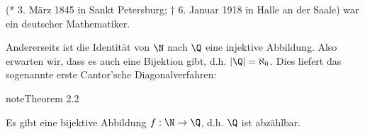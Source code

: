 \documentclass[letterpaper,10pt,english]{jupyterBook}
\begin{document}
\begin{sphinxShadowBox}

 (* 3. März 1845 in Sankt Petersburg; † 6. Januar 1918 in Halle an der Saale) war ein deutscher Mathematiker.
\end{sphinxShadowBox}

Andererseits ist die Identität von \(\N\) nach \(\Q\) eine injektive Abbildung. Also erwarten wir, dass es auch eine Bijektion gibt, d.h. \(|\Q|=\aleph_0\). Dies liefert das sogenannte erste Cantor’sche Diagonalverfahren:
\label{grundlagen/zahlensysteme:theorem-11}
\begin{sphinxadmonition}{note}{Theorem 2.2}



Es gibt eine bijektive Abbildung \(f: \N \rightarrow \Q\), d.h. \(\Q\) ist abzählbar.
\end{sphinxadmonition}
\end{document}
